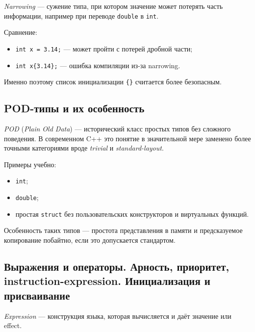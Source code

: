 \begin{definition}[Narrowing]
\textit{Narrowing} — сужение типа, при котором значение может потерять часть информации, например при переводе \texttt{double} в \texttt{int}.
\end{definition}

Сравнение:
\begin{itemize}
    \item \texttt{int x = 3.14;} — может пройти с потерей дробной части;
    \item \texttt{int x\{3.14\};} — ошибка компиляции из-за narrowing.
\end{itemize}

\begin{remark}
Именно поэтому список инициализации \texttt{\{\}} считается более безопасным.
\end{remark}

\subsection{POD-типы и их особенность}
\begin{definition}[POD]
\textit{POD} (\textit{Plain Old Data}) — исторический класс простых типов без сложного поведения. В современном C++ это понятие в значительной мере заменено более точными категориями вроде \textit{trivial} и \textit{standard-layout}.
\end{definition}

Примеры учебно:
\begin{itemize}
    \item \texttt{int};
    \item \texttt{double};
    \item простая \texttt{struct} без пользовательских конструкторов и виртуальных функций.
\end{itemize}

\begin{remark}
Особенность таких типов — простота представления в памяти и предсказуемое копирование побайтно, если это допускается стандартом.
\end{remark}

\subsection{Выражения и операторы. Арность, приоритет, instruction-expression. Инициализация и присваивание}
\begin{definition}[Выражение]
\textit{Expression} — конструкция языка, которая вычисляется и даёт значение или effect.
\end{definition}

